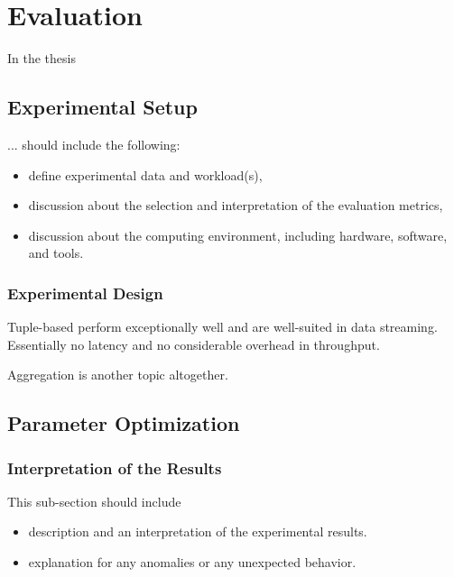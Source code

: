 \chapter{Evaluation\label{cha:chapter5}}
In the thesis 

\section{Experimental Setup\label{sec:exp}}
... should include the following:
\begin{itemize}

\item define experimental data and workload(s),
\item discussion about the selection and interpretation of the evaluation metrics,
\item discussion about the computing environment, including hardware, software, and tools.
\end{itemize}

\subsection{Experimental Design}

Tuple-based perform exceptionally well and are well-suited in data streaming. Essentially  no latency and no considerable overhead in throughput. 

Aggregation is another topic altogether. 


\section{Parameter Optimization\label{sec:parameterOptimization}}


\subsection{Interpretation of the Results}
This sub-section should include
\begin{itemize}
\item description and an interpretation of the experimental results.
\item explanation for any anomalies or any unexpected behavior.
\end{itemize}

